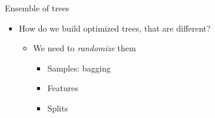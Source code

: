 \begin{frame}[fragile]{Ensemble of trees}
    \begin{itemize}
        \item How do we build optimized trees, that are different?
        \begin{itemize}
            \item We need to \emph{randomize} them
            \begin{itemize}
                \item Samples: bagging
                \item Features
                \item Splits
            \end{itemize}
        \end{itemize}
    \end{itemize}
\end{frame}

